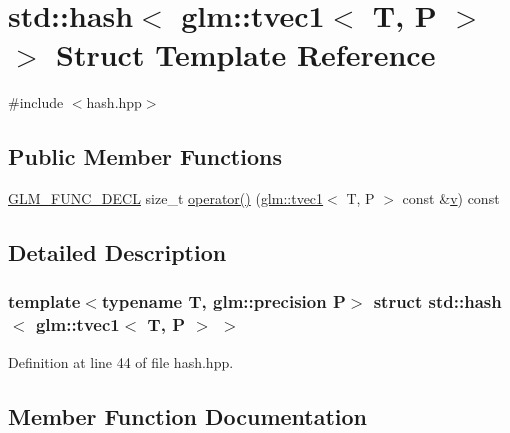 \hypertarget{structstd_1_1hash_3_01glm_1_1tvec1_3_01_t_00_01_p_01_4_01_4}{}\section{std\+::hash$<$ glm\+::tvec1$<$ T, P $>$ $>$ Struct Template Reference}
\label{structstd_1_1hash_3_01glm_1_1tvec1_3_01_t_00_01_p_01_4_01_4}


{\ttfamily \#include $<$hash.\+hpp$>$}

\subsection*{Public Member Functions}
\begin{DoxyCompactItemize}
\item 
\mbox{\hyperlink{setup_8hpp_ab2d052de21a70539923e9bcbf6e83a51}{G\+L\+M\+\_\+\+F\+U\+N\+C\+\_\+\+D\+E\+CL}} size\+\_\+t \mbox{\hyperlink{structstd_1_1hash_3_01glm_1_1tvec1_3_01_t_00_01_p_01_4_01_4_af9292500982d527b901c6bc850b075b9}{operator()}} (\mbox{\hyperlink{structglm_1_1tvec1}{glm\+::tvec1}}$<$ T, P $>$ const \&\mbox{\hyperlink{glad_8h_a14cfbe2fc2234f5504618905b69d1e06}{v}}) const
\end{DoxyCompactItemize}


\subsection{Detailed Description}
\subsubsection*{template$<$typename T, glm\+::precision P$>$\newline
struct std\+::hash$<$ glm\+::tvec1$<$ T, P $>$ $>$}



Definition at line 44 of file hash.\+hpp.



\subsection{Member Function Documentation}
\mbox{\label{structstd_1_1hash_3_01glm_1_1tvec1_3_01_t_00_01_p_01_4_01_4_af9292500982d527b901c6bc850b075b9}} 
